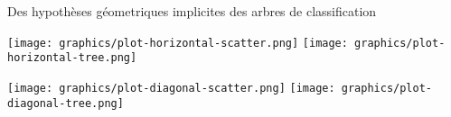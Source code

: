 

\begin{frame}{\vskip -0.5cm \large Des hypoth\`{e}ses g\'eometriques implicites des arbres de classification}

\begin{center}
\vskip -0.1cm
\texttt{[image: graphics/plot-horizontal-scatter.png]}
\quad\quad
\texttt{[image: graphics/plot-horizontal-tree.png]}
\end{center}

\begin{center}
\texttt{[image: graphics/plot-diagonal-scatter.png]}
\quad\quad
\texttt{[image: graphics/plot-diagonal-tree.png]}
\end{center}

\end{frame}
\normalsize

